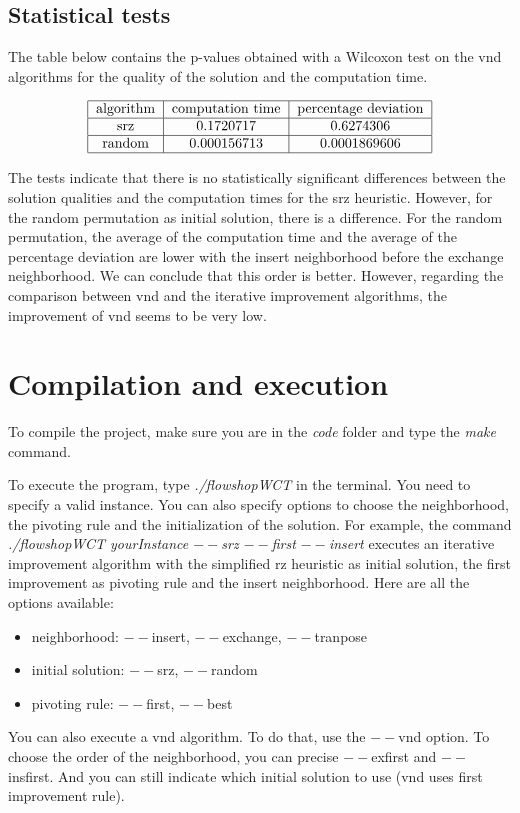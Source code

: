 \documentclass{article}
\begin{document}
\subsection{Statistical tests}

The table below contains the p-values obtained with a Wilcoxon test on the vnd algorithms for the quality of the solution and the computation time.

\begin{align*}
\begin{tabular}{|c|c|c|} \hline
    algorithm & computation time & percentage deviation \\ \hline
    srz & 0.1720717 & 0.6274306 \\ \hline
    random & 0.000156713 & 0.0001869606 \\ \hline
\end{tabular}
\end{align*}

The tests indicate that there is no statistically significant differences between the solution qualities and the computation times for the srz heuristic.
However, for the random permutation as initial solution, there is a difference.
For the random permutation, the average of the computation time and the average of the percentage deviation are lower with the insert neighborhood before the exchange neighborhood.
We can conclude that this order is better.
However, regarding the comparison between vnd and the iterative improvement algorithms, the improvement of vnd seems to be very low. 

\section{Compilation and execution}

To compile the project, make sure you are in the \textit{code} folder and type the \textit{make} command. \newline

To execute the program, type \textit{./flowshopWCT} in the terminal. You need to specify a valid instance.
You can also specify options to choose the neighborhood, the pivoting rule and the initialization of the solution.
For example, the command \textit{./flowshopWCT yourInstance $--$srz $--$first $--$insert} executes an iterative improvement algorithm with the simplified rz heuristic as initial solution, the first improvement as pivoting rule and the insert neighborhood. Here are all the options available: \newline

\begin{itemize}
    \item neighborhood: $--$insert, $--$exchange, $--$tranpose
    \item initial solution: $--$srz, $--$random
    \item pivoting rule: $--$first, $--$best
\end{itemize}

You can also execute a vnd algorithm. To do that, use the $--$vnd option. To choose the order of the neighborhood, you can precise $--$exfirst and $--$insfirst. And you can still indicate which initial solution to use (vnd uses first improvement rule).
\end{document}
